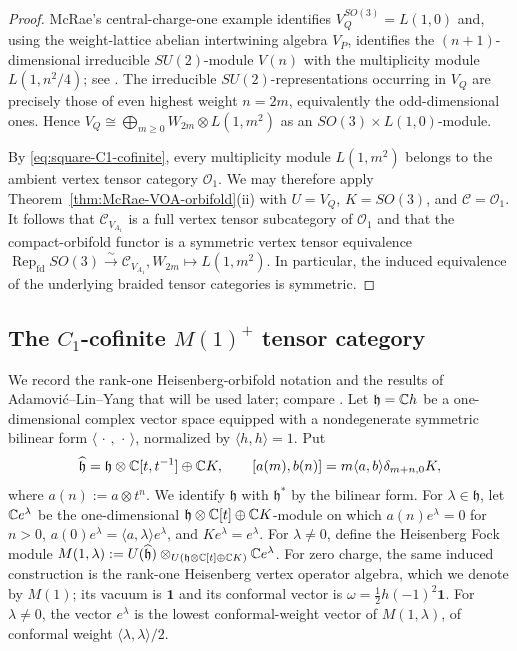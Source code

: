 \documentclass[10pt,a4paper]{amsart}
\numberwithin{equation}{section} \newtheorem{thm}{Theorem}[section] \newtheorem{lem}[thm]{Lemma} \newtheorem{ex}[thm]{Example} \newtheorem{prop}[thm]{Proposition} \newtheorem{cor}[thm]{Corollary} \newtheorem{defi}[thm]{Definition} \newtheorem{rmk}[thm]{Remark} \newtheorem{notation}[thm]{Notation}
\newcommand{\one}{\mathbf{1}}
\newcommand{\Rep}{\operatorname{Rep}}
\newcommand{\Ovir}{\mathcal O_1}
\begin{document}
\begin{proof}
McRae's central-charge-one example identifies \(V_Q^{SO(3)}=L(1,0)\) and, using the weight-lattice abelian intertwining algebra \(V_P\), identifies the \((n+1)\)-dimensional irreducible \(SU(2)\)-module \(V(n)\) with the multiplicity module \(L(1,n^2/4)\); see \cite[Example~4.11]{McRae}. The irreducible \(SU(2)\)-representations occurring in \(V_Q\) are precisely those of even highest weight \(n=2m\), equivalently the odd-dimensional ones. Hence \(V_Q\cong\bigoplus_{m\ge0}W_{2m}\otimes L(1,m^2)\) as an \(SO(3)\times L(1,0)\)-module.

By \eqref{eq:square-C1-cofinite}, every multiplicity module \(L(1,m^2)\) belongs to the ambient vertex tensor category \(\Ovir\). We may therefore apply Theorem~\ref{thm:McRae-VOA-orbifold}(ii) with \(U=V_Q\), \(K=SO(3)\), and \(\mathcal C=\Ovir\). It follows that \(\mathcal C_{V_{A_1}}\) is a full vertex tensor subcategory of \(\Ovir\) and that the compact-orbifold functor is a symmetric vertex tensor equivalence \(\Rep_{\mathrm{fd}}SO(3) \overset{\sim}{\longrightarrow} \mathcal C_{V_{A_1}}, W_{2m}\longmapsto L(1,m^2)\). In particular, the induced equivalence of the underlying braided tensor categories is symmetric.
\end{proof}

\subsection{The \texorpdfstring{$C_1$}{C1}-cofinite \texorpdfstring{$M(1)^+$}{M(1)+} tensor category}
\label{subsec:ALY-package}

We record the rank-one Heisenberg-orbifold notation and the results of Adamovi\'c--Lin--Yang that will be used later; compare \cite[Section~2.1]{ALY}. Let $\mathfrak h=\mathbb{C} h$ be a one-dimensional complex vector space equipped with a nondegenerate symmetric bilinear form $\langle\,\cdot\,,\,\cdot\,\rangle$, normalized by $\langle h,h\rangle=1$. Put
\[
\widehat{\mathfrak h}
=
\mathfrak h\otimes\mathbb{C}[t,t^{-1}]\oplus\mathbb{C} K,
\qquad
[a(m),b(n)]
=
m\langle a,b\rangle\delta_{m+n,0}K,
\]
where $a(n):=a\otimes t^n$. We identify $\mathfrak h$ with $\mathfrak h^*$ by the bilinear form. For $\lambda\in\mathfrak h$, let $\mathbb{C} e^\lambda$ be the one-dimensional $\mathfrak h\otimes\mathbb{C}[t]\oplus\mathbb{C} K$-module on which \(a(n)e^\lambda=0\) for \(n>0\), \(a(0)e^\lambda=\langle a,\lambda\rangle e^\lambda\), and \(Ke^\lambda=e^\lambda\). For $\lambda\ne0$, define the Heisenberg Fock module \(M(1,\lambda):= U(\widehat{\mathfrak h}) \otimes_{U(\mathfrak h\otimes\mathbb{C}[t]\oplus\mathbb{C} K)} \mathbb{C} e^\lambda\). For zero charge, the same induced construction is the rank-one Heisenberg vertex operator algebra, which we denote by $M(1)$; its vacuum is $\one$ and its conformal vector is $\omega=\frac12h(-1)^2\one$. For $\lambda\ne0$, the vector $e^\lambda$ is the lowest conformal-weight vector of $M(1,\lambda)$, of conformal weight $\langle\lambda,\lambda\rangle/2$.
\end{document}
